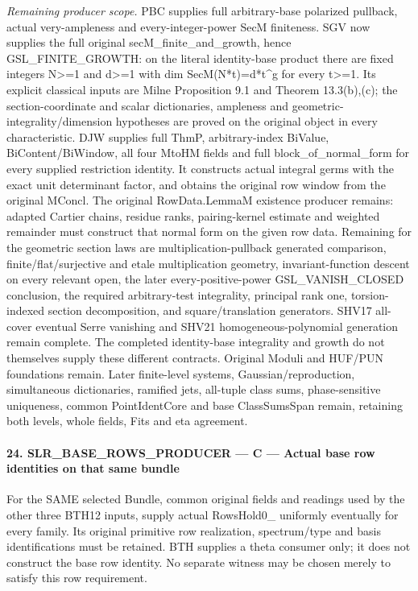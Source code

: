 \emph{Remaining producer scope.} PBC supplies full arbitrary-base polarized pullback, actual very-ampleness and every-integer-power SecM finiteness. SGV now supplies the full original secM\_\allowbreak finite\_\allowbreak and\_\allowbreak growth, hence GSL\_\allowbreak FINITE\_\allowbreak GROWTH: on the literal identity-base product there are fixed integers N>=1 and d>=1 with dim SecM(N*t)=d*t\textasciicircum{}g for every t>=1. Its explicit classical inputs are Milne Proposition 9.1 and Theorem 13.3(b),(c); the section-coordinate and scalar dictionaries, ampleness and geometric-integrality/dimension hypotheses are proved on the original object in every characteristic. DJW supplies full ThmP, arbitrary-index BiValue, BiContent/BiWindow, all four MtoHM fields and full block\_\allowbreak of\_\allowbreak normal\_\allowbreak form for every supplied restriction identity. It constructs actual integral germs with the exact unit determinant factor, and obtains the original row window from the original MConcl. The original RowData.LemmaM existence producer remains: adapted Cartier chains, residue ranks, pairing-kernel estimate and weighted remainder must construct that normal form on the given row data. Remaining for the geometric section laws are multiplication-pullback generated comparison, finite/flat/surjective and etale multiplication geometry, invariant-function descent on every relevant open, the later every-positive-power GSL\_\allowbreak VANISH\_\allowbreak CLOSED conclusion, the required arbitrary-test integrality, principal rank one, torsion-indexed section decomposition, and square/translation generators. SHV17 all-cover eventual Serre vanishing and SHV21 homogeneous-polynomial generation remain complete. The completed identity-base integrality and growth do not themselves supply these different contracts. Original Moduli and HUF/PUN foundations remain. Later finite-level systems, Gaussian/reproduction, simultaneous dictionaries, ramified jets, all-tuple class sums, phase-sensitive uniqueness, common PointIdentCore and base ClassSumsSpan remain, retaining both levels, whole fields, Fits and eta agreement.



\paragraph{24. SLR\_\allowbreak BASE\_\allowbreak ROWS\_\allowbreak PRODUCER — C — Actual base row identities on that same bundle}

For the SAME selected Bundle, common original fields and readings used by the other three BTH12 inputs, supply actual RowsHold0\_ uniformly eventually for every family. Its original primitive row realization, spectrum/type and basis identifications must be retained. BTH supplies a theta consumer only; it does not construct the base row identity. No separate witness may be chosen merely to satisfy this row requirement.


